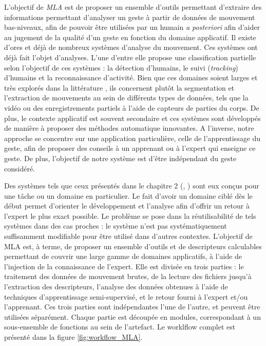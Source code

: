 L'objectif de \textit{MLA} est de proposer un ensemble d'outils permettant d'extraire des informations permettant d'analyser un geste à partir de données de mouvement bas-niveaux, afin de pouvoir être utilisées par un humain \textit{a posteriori} afin d'aider au jugement de la qualité d'un geste en fonction du domaine applicatif. Il existe d'ores et déjà de nombreux systèmes d'analyse du mouvement. Ces systèmes ont déjà fait l'objet d'analyses. L'une d'entre elle propose une classification partielle selon l'objectif de ces systèmes \parencite{Wang2003Rdi} : la détection d'humains, le suivi (\textit{tracking}) d'humains et la reconnaissance d'activité. Bien que ces domaines soient larges et très explorés dans la littérature \parencite{Yang2011Raa} \parencite{Aggarwal2014Har}, ils concernent plutôt la segmentation et  l'extraction de mouvements au sein de différents types de données, tels que la vidéo ou des enregistrements partiels à l'aide de capteurs de parties du corps. De plus, le contexte applicatif est souvent secondaire et ces systèmes sont développés de manière à proposer des méthodes automatique innovantes. A l'inverse, notre approche se concentre sur une application particulière, celle de l'apprentissage du geste, afin de proposer des conseils à un apprenant ou à l'expert qui enseigne ce geste. De plus, l'objectif de notre système est d'être indépendant du geste considéré.

Des systèmes tels que ceux présentés dans le chapitre 2 (\parencite{Ferrari2018MAS}, \parencite{Makio2007DoS}) sont eux conçus pour une tâche ou un domaine en particulier. Le fait d'avoir un domaine ciblé dès le début permet d'orienter le développement et l'analyse afin d'offrir un retour à l'expert le plus exact possible. Le problème se pose dans la réutilisabilité de tels systèmes dans des cas proches : le système n'est pas systématiquement suffisamment modifiable pour être utilisé dans d'autres contextes. L'objectif de MLA est, à terme, de proposer un ensemble d'outils et de descripteurs calculables permettant de couvrir une large gamme de domaines applicatifs, à l'aide de l'injection de la connaissance de l'expert. Elle est divisée en trois parties : le traitement des données de mouvement brutes, de la lecture des fichiers jusqu'à l'extraction des descripteurs, l'analyse des données obtenues à l'aide de techniques d'apprentissage semi-supervisé, et le retour fourni à l'expert et/ou l'apprenant. Ces trois parties sont indépendantes l'une de l'autre, et peuvent être utilisées séparément. Chaque partie est découpée en modules, correspondant à un sous-ensemble de fonctions au sein de l'artefact. Le worklflow complet est présenté dans la figure  \ref{fig:workflow_MLA}.

